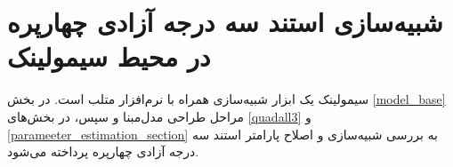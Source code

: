 \chapter{شبیه‌سازی استند سه درجه آزادی چهارپره در محیط سیمولینک}
سیمولینک یک ابزار شبیه‌سازی همراه با نرم‌افزار متلب است.
در بخش
\ref{model_base}
 مراحل طراحی مدل‌مبنا و سپس، در بخش‌های
\ref{quadall3}
و
\ref{parameeter_estimation_section}
به بررسی شبیه‌سازی و اصلاح پارامتر استند سه درجه آزادی چهارپره پرداخته می‌شود.